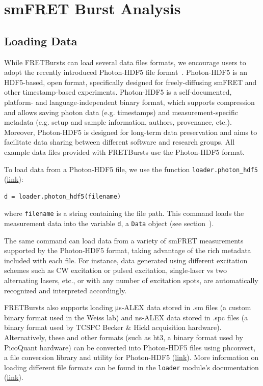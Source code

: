 \documentclass[10pt,letterpaper]{article}
\begin{document}
\section*{smFRET Burst Analysis}
\label{sec:analysis}

\subsection*{Loading Data}
\label{sec:dataload}
While FRETBursts can load several data files formats,
we encourage users to adopt the recently introduced Photon-HDF5
file format~\cite{Ingargiola2016}.
Photon-HDF5 is an HDF5-based, open format, specifically designed
for freely-diffusing smFRET and
other timestamp-based experiments.
Photon-HDF5 is a self-documented, platform- and language-independent binary format,
which supports compression and allows saving photon data (e.g. timestamps)
and measurement-specific metadata
(e.g. setup and sample information, authors, provenance, etc.).
Moreover, Photon-HDF5 is designed for long-term data preservation and aims
to facilitate data sharing
between different software and research groups.
All example data files provided with FRETBursts use the Photon-HDF5 format.

To load data from a Photon-HDF5 file, we use the function \verb|loader.photon_hdf5|
(\href{http://fretbursts.readthedocs.org/en/latest/loader.html#fretbursts.loader.photon_hdf5}{link}):

\begin{lstlisting}
d = loader.photon_hdf5(filename)
\end{lstlisting}

\noindent
where \verb|filename| is a string containing the file path.
This command loads the measurement data into the variable \verb|d|,
a \verb|Data| object (see section~).

The same command can load data from a variety of smFRET measurements supported
by the Photon-HDF5 format, taking advantage of the rich metadata included with each file.
For instance, data generated using different excitation schemes such as CW excitation
or pulsed excitation, single-laser vs two alternating lasers, etc.,
or with any number of excitation spots, are automatically recognized and interpreted accordingly.

FRETBursts also supports loading μs-ALEX data stored in .sm files
(a custom binary format used in the Weiss lab) and
ns-ALEX data stored in .spc files (a binary format used by TCSPC Becker \& Hickl acquisition hardware).
Alternatively, these and other formats (such as ht3, a binary format used by PicoQuant hardware)
can be converted into Photon-HDF5 files using phconvert,
a file conversion library and utility for Photon-HDF5
(\href{http://photon-hdf5.github.io/phconvert/}{link}).
More information on loading different file formats
can be found in the \verb|loader| module's documentation
(\href{http://fretbursts.readthedocs.org/en/latest/loader.html}{link}).
\end{document}
